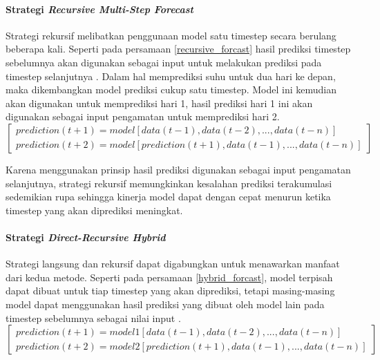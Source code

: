 \documentclass[../thesis.tex]{subfiles}
\begin{document}
\paragraph{Strategi \textit{Recursive Multi-Step Forecast}} 

Strategi rekursif melibatkan penggunaan model satu timestep secara berulang beberapa kali. Seperti pada persamaan \ref{recursive_forcast} hasil prediksi timestep sebelumnya akan digunakan sebagai input untuk melakukan prediksi pada timestep selanjutnya \cite{Forecast_Strategy}.
Dalam hal memprediksi suhu untuk dua hari ke depan, maka dikembangkan model prediksi cukup satu timestep. Model ini kemudian akan digunakan untuk memprediksi hari 1, hasil prediksi hari 1 ini akan digunakan sebagai input pengamatan untuk memprediksi hari 2.
\begin{equation} \label{recursive_forcast}
\begin{bmatrix}
		prediction(t+1) = model[data(t-1), data(t-2), ..., data(t-n)]
		\\prediction(t+2) = model[prediction(t+1), data(t-1), ..., data(t-n)]
\end{bmatrix}
\end{equation}

Karena menggunakan prinsip hasil prediksi digunakan sebagai input pengamatan selanjutnya, strategi rekursif memungkinkan kesalahan prediksi terakumulasi sedemikian rupa sehingga kinerja model dapat dengan cepat menurun ketika timestep yang akan diprediksi meningkat.

\paragraph{Strategi \textit{Direct-Recursive Hybrid}}

Strategi langsung dan rekursif dapat digabungkan untuk menawarkan manfaat dari kedua metode.
Seperti pada persamaan \ref{hybrid_forcast}, model terpisah dapat dibuat untuk tiap timestep yang akan diprediksi, tetapi masing-masing model dapat menggunakan hasil prediksi yang dibuat oleh model lain pada timestep sebelumnya sebagai nilai input \cite{Forecast_Strategy}.
\begin{equation} \label{hybrid_forcast}
\begin{bmatrix}
		prediction(t+1) = model1[data(t-1), data(t-2), ..., data(t-n)]
		\\prediction(t+2) = model2[prediction(t+1), data(t-1), ..., data(t-n)]
\end{bmatrix}
\end{equation}
\end{document}
